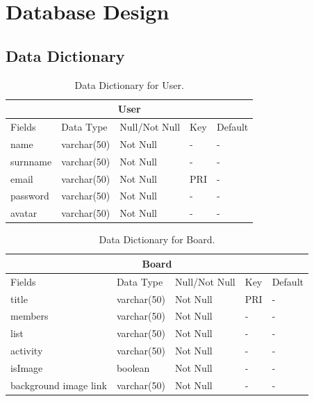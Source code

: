 \chapter{Database Design}
\section{Data Dictionary}
\begin{table}[h]
\begin{tabular}[center]{|l|l|l|l|l|}
  \hline
  \multicolumn{5}{|c|}{User} \\
  \hline
  Fields & Data Type & Null/Not Null & Key & Default \\
  \hline
  name & varchar(50) & Not Null & - & - \\
  surnname & varchar(50) & Not Null & - & - \\
  email & varchar(50) & Not Null & PRI & - \\
  password & varchar(50) & Not Null & - & - \\
  avatar & varchar(50) & Not Null & - & - \\
  \hline
\end{tabular}
\caption{\label{tab:table-name}Data Dictionary for User.}
\end{table}

\vspace{10 mm}

\begin{table}[h]
\begin{tabular}[center]{|l|l|l|l|l|}
  \hline
  \multicolumn{5}{|c|}{Board} \\
  \hline
  Fields & Data Type & Null/Not Null & Key & Default \\
  \hline
  title & varchar(50) & Not Null & PRI & - \\
  members & varchar(50) & Not Null & - & - \\
  list & varchar(50) & Not Null & - & - \\
  activity & varchar(50) & Not Null & - & - \\
  isImage & boolean & Not Null & - & - \\
  background image link & varchar(50) & Not Null & - & - \\
  \hline
\end{tabular}
\caption{\label{tab:table-name}Data Dictionary for Board.}
\end{table}

\vspace{10 mm}

